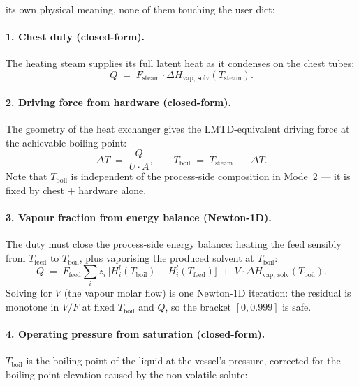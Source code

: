 \documentclass[11pt,a4paper]{article}
\begin{document}
its own physical meaning, none of them touching the user dict:

\paragraph{1. Chest duty (closed-form).}
The heating steam supplies its full latent heat as it condenses
on the chest tubes:
\begin{equation}
   Q   \; = \;   F_{\!\text{steam}} \cdot \Delta H_{\mathrm{vap},\,\text{solv}}(T_{\!\text{steam}}).
   \label{eq:evap-Q-chest}
\end{equation}

\paragraph{2. Driving force from hardware (closed-form).}
The geometry of the heat exchanger gives the LMTD-equivalent driving
force at the achievable boiling point:
\begin{equation}
   \Delta T   \; = \;   \frac{Q}{U \cdot A},
   \qquad
   T_{\!\text{boil}}   \; = \;   T_{\!\text{steam}}   \; - \;   \Delta T.
   \label{eq:evap-dT}
\end{equation}
Note that $T_{\!\text{boil}}$ is independent of the process-side
composition in Mode~2 --- it is fixed by chest + hardware alone.

\paragraph{3. Vapour fraction from energy balance (Newton-1D).}
The duty must close the process-side energy balance: heating the
feed sensibly from $T_{\!\text{feed}}$ to $T_{\!\text{boil}}$,
plus vaporising the produced solvent at $T_{\!\text{boil}}$:
\begin{equation}
   Q
   \; = \;
   F_{\!\text{feed}}\!\!\sum_{i}\!z_i\,
        \bigl[H^{\!l}_i(T_{\!\text{boil}})\!-\!H^{\!l}_i(T_{\!\text{feed}})\bigr]
   \;+\;
   V \cdot \Delta H_{\mathrm{vap},\,\text{solv}}(T_{\!\text{boil}}).
   \label{eq:evap-energy}
\end{equation}
Solving for $V$ (the vapour molar flow) is one Newton-1D iteration:
the residual is monotone in $V/F$ at fixed $T_{\!\text{boil}}$ and
$Q$, so the bracket $[0, 0.999]$ is safe.

\paragraph{4. Operating pressure from saturation (closed-form).}
$T_{\!\text{boil}}$ is the boiling point of the liquid at the
vessel's pressure, corrected for the boiling-point elevation
caused by the non-volatile solute:
\end{document}
